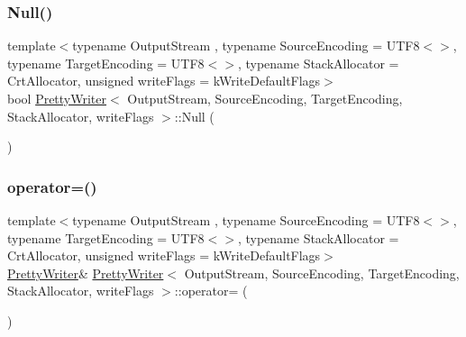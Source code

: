 \mbox{\label{classPrettyWriter_aa144f2d0f0c3c69248cdbe957349528c}} 
\subsubsection{\texorpdfstring{Null()}{Null()}}
{\footnotesize\ttfamily template$<$typename Output\+Stream , typename Source\+Encoding  = U\+T\+F8$<$$>$, typename Target\+Encoding  = U\+T\+F8$<$$>$, typename Stack\+Allocator  = Crt\+Allocator, unsigned write\+Flags = k\+Write\+Default\+Flags$>$ \\
bool \hyperlink{classPrettyWriter}{Pretty\+Writer}$<$ Output\+Stream, Source\+Encoding, Target\+Encoding, Stack\+Allocator, write\+Flags $>$\+::Null (\begin{DoxyParamCaption}{ }\end{DoxyParamCaption})\hspace{0.3cm}{\ttfamily [inline]}}

\mbox{\label{classPrettyWriter_acf82b0bb61c1fab002d84a458674ff03}} 
\subsubsection{\texorpdfstring{operator=()}{operator=()}}
{\footnotesize\ttfamily template$<$typename Output\+Stream , typename Source\+Encoding  = U\+T\+F8$<$$>$, typename Target\+Encoding  = U\+T\+F8$<$$>$, typename Stack\+Allocator  = Crt\+Allocator, unsigned write\+Flags = k\+Write\+Default\+Flags$>$ \\
\hyperlink{classPrettyWriter}{Pretty\+Writer}\& \hyperlink{classPrettyWriter}{Pretty\+Writer}$<$ Output\+Stream, Source\+Encoding, Target\+Encoding, Stack\+Allocator, write\+Flags $>$\+::operator= (\begin{DoxyParamCaption}\item[{const \hyperlink{classPrettyWriter}{Pretty\+Writer}$<$ Output\+Stream, Source\+Encoding, Target\+Encoding, Stack\+Allocator, write\+Flags $>$ \&}]{ }\end{DoxyParamCaption})\hspace{0.3cm}{\ttfamily [private]}}

\mbox{\label{classPrettyWriter_a09709ffa3b545e007631ecfd35029843}} 
